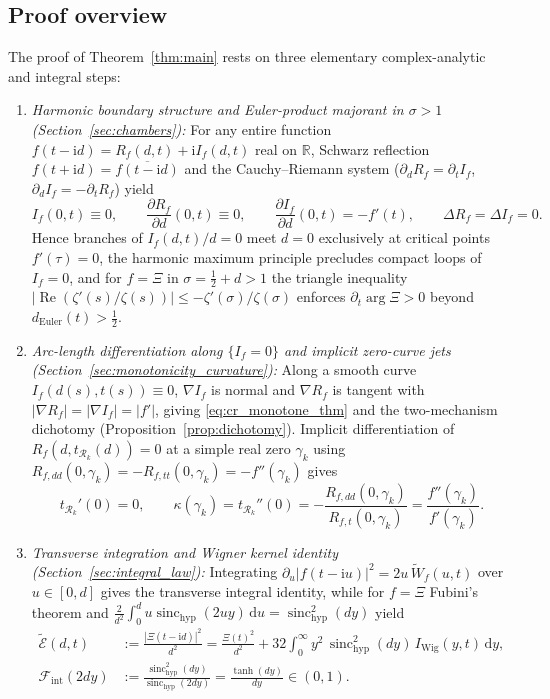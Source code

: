 \documentclass[11pt,a4paper,reqno]{amsart}
\theoremstyle{definition}
\theoremstyle{remark}
\numberwithin{equation}{section}
\newcommand{\dd}{\mathrm{d}}
\newcommand{\ii}{\mathrm{i}}
\newcommand{\Rea}{\operatorname{Re}}
\newcommand{\Wtil}{\widetilde{W}}
\newcommand{\Etil}{\widetilde{\mathcal{E}}}
\newcommand{\sinch}{\operatorname{sinc}_{\mathrm{hyp}}}
\newcommand{\Fint}{\mathcal{F}_{\mathrm{int}}}
\begin{document}
\subsection{Proof overview}\label{subsec:proof_overview}

The proof of Theorem~\ref{thm:main} rests on three elementary complex-analytic and integral steps:
\begin{enumerate}
\item \emph{Harmonic boundary structure and Euler-product majorant in $\sigma > 1$ (Section~\ref{sec:chambers}):} For any entire function $f(t-\ii d) = R_f(d,t) + \ii I_f(d,t)$ real on $\mathbb{R}$, Schwarz reflection $f(t+\ii d) = \overline{f(t-\ii d)}$ and the Cauchy--Riemann system ($\partial_d R_f = \partial_t I_f$, $\partial_d I_f = -\partial_t R_f$) yield
\begin{equation}\label{eq:ingred1}
I_f(0,t) \equiv 0, \qquad \frac{\partial R_f}{\partial d}(0,t) \equiv 0, \qquad \frac{\partial I_f}{\partial d}(0,t) = -f'(t), \qquad \Delta R_f = \Delta I_f = 0.
\end{equation}
Hence branches of $I_f(d,t)/d = 0$ meet $d = 0$ exclusively at critical points $f'(\tau) = 0$, the harmonic maximum principle precludes compact loops of $I_f = 0$, and for $f = \Xi$ in $\sigma = \frac{1}{2}+d > 1$ the triangle inequality $|\Rea(\zeta'(s)/\zeta(s))| \le -\zeta'(\sigma)/\zeta(\sigma)$ enforces $\partial_t\arg\Xi > 0$ beyond $d_{\mathrm{Euler}}(t) > \frac{1}{2}$.
\item \emph{Arc-length differentiation along $\{I_f=0\}$ and implicit zero-curve jets (Section~\ref{sec:monotonicity_curvature}):} Along a smooth curve $I_f(d(s),t(s)) \equiv 0$, $\nabla I_f$ is normal and $\nabla R_f$ is tangent with $|\nabla R_f| = |\nabla I_f| = |f'|$, giving \eqref{eq:cr_monotone_thm} and the two-mechanism dichotomy (Proposition~\ref{prop:dichotomy}). Implicit differentiation of $R_f(d, t_{\mathcal{R}_k}(d)) = 0$ at a simple real zero $\gamma_k$ using $R_{f,dd}(0,\gamma_k) = -R_{f,tt}(0,\gamma_k) = -f''(\gamma_k)$ gives
\begin{equation}\label{eq:ingred2}
t_{\mathcal{R}_k}'(0) = 0, \qquad \kappa(\gamma_k) = t_{\mathcal{R}_k}''(0) = -\frac{R_{f,dd}(0,\gamma_k)}{R_{f,t}(0,\gamma_k)} = \frac{f''(\gamma_k)}{f'(\gamma_k)}.
\end{equation}
\item \emph{Transverse integration and Wigner kernel identity (Section~\ref{sec:integral_law}):} Integrating $\partial_u|f(t-\ii u)|^2 = 2u\,\Wtil_f(u,t)$ over $u \in [0,d]$ gives the transverse integral identity, while for $f = \Xi$ Fubini's theorem and $\frac{2}{d^2}\int_0^d u\sinch(2u y)\,\dd u = \sinch^2(d y)$ yield
\begin{equation}\label{eq:ingred3}
\begin{aligned}
\Etil(d,t) &:= \frac{|\Xi(t-\ii d)|^2}{d^2} = \frac{\Xi(t)^2}{d^2} + 32\int_0^\infty y^2\,\sinch^2(d y)\,I_{\mathrm{Wig}}(y,t)\,\dd y, \\
\Fint(2d y) &:= \frac{\sinch^2(d y)}{\sinch(2d y)} = \frac{\tanh(d y)}{d y} \in (0,1).
\end{aligned}
\end{equation}
\end{enumerate}
\end{document}
